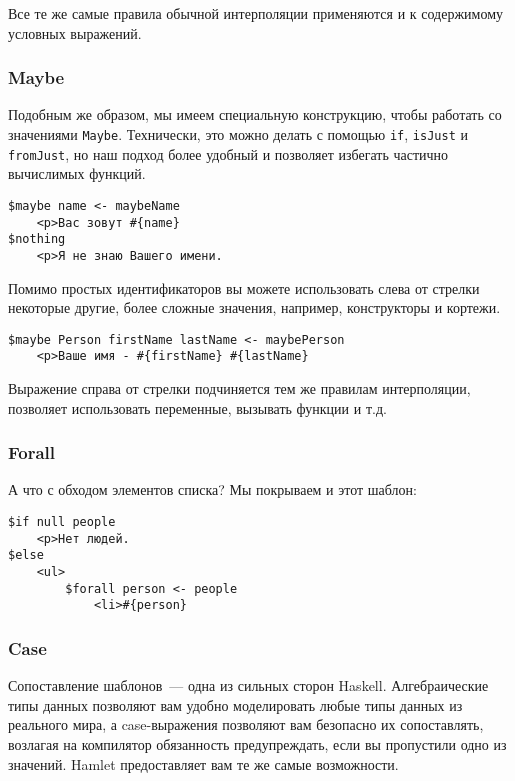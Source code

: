 Все те же самые правила обычной интерполяции применяются и к содержимому
условных выражений.

\subsubsection{Maybe}

Подобным же образом, мы имеем специальную конструкцию, чтобы работать со
значениями \lstinline!Maybe!. Технически, это можно делать с помощью
\lstinline'if', \lstinline'isJust' и \lstinline'fromJust', но наш подход более удобный и
позволяет избегать частично вычислимых функций.

\begin{lstlisting}
$maybe name <- maybeName
    <p>Ваc зовут #{name}
$nothing
    <p>Я не знаю Вашего имени.
\end{lstlisting}

Помимо простых идентификаторов вы можете использовать слева от стрелки
некоторые другие, более сложные значения, например, конструкторы и кортежи.

\begin{lstlisting}
$maybe Person firstName lastName <- maybePerson
    <p>Ваше имя - #{firstName} #{lastName}
\end{lstlisting}

Выражение справа от стрелки подчиняется тем же правилам интерполяции, позволяет
использовать переменные, вызывать функции и т.д.

\subsubsection{Forall}

А что с обходом элементов списка? Мы покрываем и этот шаблон:

\begin{lstlisting}
$if null people
    <p>Нет людей.
$else
    <ul>
        $forall person <- people
            <li>#{person}
\end{lstlisting}


\subsubsection{Case}

Сопоставление шаблонов~--- одна из сильных сторон Haskell. Алгебраические типы
данных позволяют вам удобно моделировать любые типы данных из реального мира, а
case-выражения позволяют вам безопасно их сопоставлять, возлагая на компилятор
обязанность предупреждать, если вы пропустили одно из значений.  Hamlet
предоставляет вам те же самые возможности.

